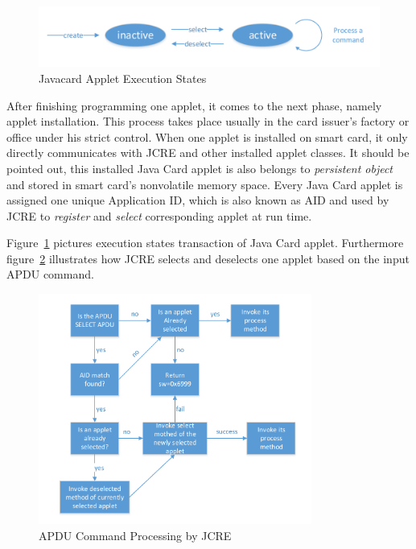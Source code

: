 \begin{figure}[!htbp]
	\centering
	\includegraphics[width=1\textwidth]{applet-execution-states}
		\caption{Javacard Applet Execution States \cite{handbuch}}
	\label{fig:applet-execution-states}
\end{figure}
After finishing programming one applet, it comes to the next phase, namely applet installation. This process takes place usually in the card issuer's factory or office under his strict control. When one applet is installed on smart card, it only directly communicates with JCRE and other installed applet classes. It should be pointed out, this installed Java Card applet is also belongs to \emph{persistent object} and stored in smart card's nonvolatile memory space. Every Java Card applet is assigned one unique Application ID, which is also known as AID and used by JCRE to \emph{register} and \emph{select} corresponding applet at run time.

Figure~\ref{fig:applet-execution-states} pictures execution states transaction of Java Card applet. Furthermore figure~\ref{fig:apdu-command-processing} illustrates how JCRE selects and deselects one applet based on the input APDU command.

\begin{figure}[!htbp]
	\centering
	\includegraphics[width=0.8\textwidth]{apdu-command-processing}
		\caption{APDU Command Processing by JCRE \cite{handbuch}}
	\label{fig:apdu-command-processing}
\end{figure}


